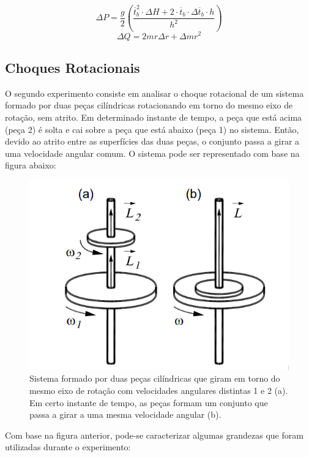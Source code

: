 \[
    \Delta P = \frac{g}{2} 
    \left( 
        \frac
        {\overline{t}_b^2 \cdot \Delta H + 2 \cdot \overline{t}_b \cdot \Delta \overline{t}_b \cdot h}
        {h^2} 
    \right)
\]
\[\Delta Q = 2mr \Delta r + \Delta m r^2\]


\subsection{Choques Rotacionais}

O segundo experimento consiste em analisar o choque rotacional de um sistema formado por duas peças cilíndricas rotacionando em torno do mesmo eixo de rotação, sem atrito. Em determinado instante de tempo, a peça que está acima (peça 2) é solta e cai sobre a peça que está abaixo (peça 1) no sistema. Então, devido ao atrito entre as superfícies das duas peças, o conjunto passa a girar a uma velocidade angular comum. O sistema pode ser representado com base na figura abaixo:

\begin{figure}[H]
  \centering
  \includegraphics[scale=0.8]{images/choque_rotacional.png}
  \caption{Sistema formado por duas peças cilíndricas que giram em torno do mesmo eixo de rotação com velocidades angulares distintas 1 e 2 (a). Em certo instante de tempo, as peças formam um conjunto que passa a girar a uma mesma velocidade angular (b).}
\end{figure}

Com base na figura anterior, pode-se caracterizar algumas grandezas que foram utilizadas durante o experimento:

